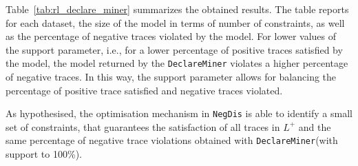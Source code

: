 \documentclass[a4wide,11pt]{article}
\theoremstyle{definition}
\theoremstyle{plain}
\newcommand{\nd}{\texttt{NegDis}\xspace}
\newcommand{\declareminer}{\texttt{DeclareMiner}\xspace}
\newcommand\para[1]{\textnormal{\textsf{#1}}}
\begin{document}
Table~\ref{tab:rl_declare_miner} summarizes the obtained results. The table reports for each dataset, the size of the model in terms of number of constraints, as well as the percentage of negative traces violated by the model. For lower values of the \para{support} parameter, i.e., for a lower percentage of positive traces satisfied by the model, the model returned by the \declareminer violates a higher percentage of negative traces. In this way, the \para{support} parameter allows for balancing the percentage of positive trace satisfied and negative traces violated. 

As hypothesised, the optimisation mechanism in \nd is able to identify a small set of constraints, that guarantees the satisfaction of all traces in $L^+$ and the same percentage of negative trace violations obtained with \declareminer (with \para{support} to 100\%).

\begin{table} [ht]
	\centering
		\caption{\declareminer results}
		\label{tab:rl_declare_miner}
\end{table}
\end{document}
